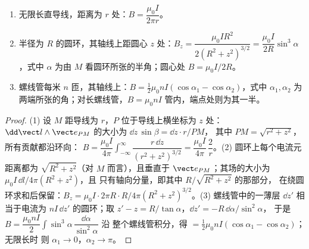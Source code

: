 \begin{proposition}\label{prop:b1:magnetostatics:three}
\begin{enumerate}
  \item 无限长直导线，距离为 $r$ 处：$B = \dfrac{\mu_0I}{2\pi r}$。
  \item 半径为 $R$ 的圆环，其轴线上距圆心 $z$
        处：$B_z = \dfrac{\mu_0IR^2}{2(R^2 + z^2)^{3/2}} = \dfrac{\mu_0I}{2R}
        \sin^3\alpha$，式中 $\alpha$ 为由
        $M$ 看圆环所张的半角；圆心处 $B = \mu_0I/2R$。
  \item 螺线管每米 $n$ 匝，其轴线上：$B = \tfrac12\mu_0nI
        (\cos\alpha_1 - \cos\alpha_2)$，式中 $\alpha_1, \alpha_2$ 为
        两端所张的角；对长螺线管，$B = \mu_0nI$
        管内，端点处则为其一半。
\end{enumerate}
\end{proposition}

\begin{proof}
(1) 设 $M$ 距导线为 $r$，$P$ 位于导线上横坐标为 $z$ 处：
$\dd\vect l\wedge\vect e_{PM}$ 的大小为 $\dd z\,\sin\beta = \dd z\cdot r/PM$，
其中 $PM = \sqrt{r^2 + z^2}$，所有贡献都沿环向：
$B = \dfrac{\mu_0I}{4\pi}\displaystyle\int_{-\infty}^{\infty}\dfrac{r\,\dd z}{(r^2 + z^2)^{3/2}}
= \dfrac{\mu_0I}{4\pi}\,\dfrac{2}{r}$。(2) 圆环上每个电流元
距离都为 $\sqrt{R^2 + z^2}$（对 $M$ 而言），且垂直于
$\vect e_{PM}$；其场的大小为 $\mu_0I\,\dd l/4\pi(R^2 + z^2)$，且
只有轴向分量，即其中 $R/\sqrt{R^2 + z^2}$ 的那部分，
在绕圆环求和后保留：$B_z = \mu_0I\cdot2\pi R\cdot R/4\pi(R^2 +
z^2)^{3/2}$。(3) 螺线管中的一薄层 $\dd z'$ 相当于电流为
$nI\,\dd z'$ 的圆环；取 $z' - z = R/\tan\alpha$，$\dd z' = -R\,\dd\alpha/\sin^2\alpha$，
于是 $B = \dfrac{\mu_0nI}{2}\displaystyle\int\sin^3\alpha\,\dfrac{\dd\alpha}{\sin^2\alpha}$ 沿
整个螺线管积分，得 $= \tfrac12\mu_0nI(\cos\alpha_1 - \cos\alpha_2)$；无限长时
则 $\alpha_1 \to 0$，$\alpha_2 \to \pi$。
\end{proof}

